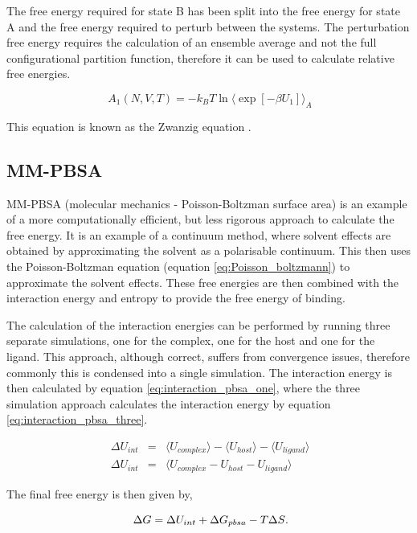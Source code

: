 The free energy required for state B has been split into the free energy for state A and the free energy required to perturb between the systems.  The perturbation free energy requires the calculation of an ensemble average and not the full configurational partition function, therefore it can be used to calculate relative free energies.

\begin{equation}
\ A_{1}(N,V,T) = -k_B T \ln \langle \exp [ - \beta U_{1} ] \rangle_{A}
\end{equation}

This equation is known as the Zwanzig equation \cite{zwanzig}.

\subsection{MM-PBSA}

MM-PBSA (molecular mechanics - Poisson-Boltzman surface area) is an example of a more computationally efficient, but less rigorous approach to calculate the free energy\cite{PBSA_Case}.  It is an example of a continuum method, where solvent effects are obtained by approximating the solvent as a polarisable continuum.  This then uses the Poisson-Boltzman equation (equation \ref{eq:Poisson_boltzmann}) to approximate the solvent effects.  These free energies are then combined with the interaction energy and entropy to provide the free energy of binding.

The calculation of the interaction energies can be performed by running three separate simulations, one for the complex, one for the host and one for the ligand.  This approach, although correct, suffers from convergence issues, therefore commonly this is condensed into a single simulation.  The interaction energy is then calculated by equation \ref{eq:interaction_pbsa_one}, where the three simulation approach calculates the interaction energy by equation \ref{eq:interaction_pbsa_three}.

\begin{eqnarray} \label{eq:interaction_pbsa_three}
\ \Delta U_{int} &=& \langle U_{complex} \rangle - \langle U_{host} \rangle -\langle U_{ligand} \rangle \\ \label{eq:interaction_pbsa_one}
\ \Delta U_{int} &=& \langle U_{complex} - U_{host} - U_{ligand} \rangle
\end{eqnarray}


The final free energy is then given by,

\begin{equation} \label{eq:mm-pbsa}
\ \Delta G = \Delta U_{int} + \Delta G_{pbsa} - T \Delta S \\.
\end{equation}


